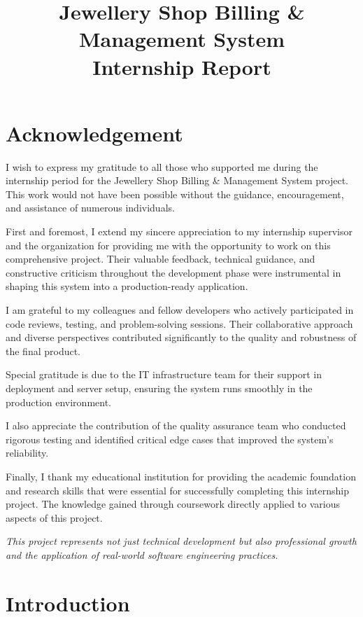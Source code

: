 \documentclass[12pt,a4paper]{report}
\title{\textbf{Jewellery Shop Billing \& Management System} \\ \large Internship Report}
\author{}
\date{}
\begin{document}
\pagebreak
\tableofcontents
\pagebreak

\listoffigures
\pagebreak

\chapter*{Acknowledgement}

I wish to express my gratitude to all those who supported me during the internship period for the Jewellery Shop Billing \& Management System project. This work would not have been possible without the guidance, encouragement, and assistance of numerous individuals.

First and foremost, I extend my sincere appreciation to my internship supervisor and the organization for providing me with the opportunity to work on this comprehensive project. Their valuable feedback, technical guidance, and constructive criticism throughout the development phase were instrumental in shaping this system into a production-ready application.

I am grateful to my colleagues and fellow developers who actively participated in code reviews, testing, and problem-solving sessions. Their collaborative approach and diverse perspectives contributed significantly to the quality and robustness of the final product.

Special gratitude is due to the IT infrastructure team for their support in deployment and server setup, ensuring the system runs smoothly in the production environment.

I also appreciate the contribution of the quality assurance team who conducted rigorous testing and identified critical edge cases that improved the system's reliability.

Finally, I thank my educational institution for providing the academic foundation and research skills that were essential for successfully completing this internship project. The knowledge gained through coursework directly applied to various aspects of this project.

\vfill

\noindent \textit{This project represents not just technical development but also professional growth and the application of real-world software engineering practices.}

\newpage

\chapter{Introduction}
\end{document}
